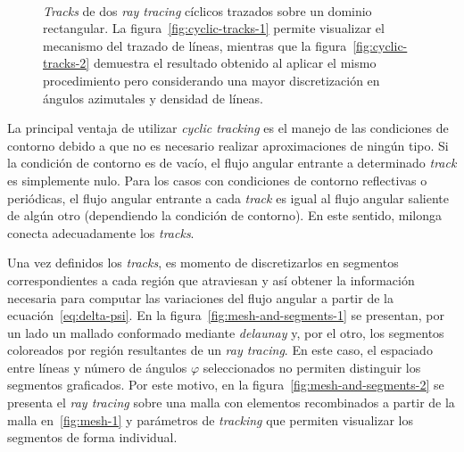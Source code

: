 \documentclass[11pt]{article}
\numberwithin{equation}{section}
\begin{document}
\begin{figure}[!ht]
 \begin{center}
  \\
  \caption{\emph{Tracks} de dos \emph{ray tracing} cíclicos trazados sobre un dominio rectangular. La figura~\ref{fig:cyclic-tracks-1} permite visualizar el mecanismo del trazado de líneas, mientras que la figura~\ref{fig:cyclic-tracks-2} demuestra el resultado obtenido al aplicar el mismo procedimiento pero considerando una mayor discretización en ángulos azimutales y densidad de líneas.}
  \label{fig:cyclic-tracks}
 \end{center}
\end{figure}

La principal ventaja de utilizar \emph{cyclic tracking} es el manejo de las condiciones de contorno debido a que no es necesario realizar aproximaciones de ningún tipo. Si la condición de contorno es de vacío, el flujo angular entrante a determinado \emph{track} es simplemente nulo. Para los casos con condiciones de contorno reflectivas o periódicas, el flujo angular entrante a cada \emph{track} es igual al flujo angular saliente de algún otro (dependiendo la condición de contorno). En este sentido, milonga conecta adecuadamente los \emph{tracks}.

Una vez definidos los \emph{tracks}, es momento de discretizarlos en segmentos correspondientes a cada región que atraviesan y así obtener la información necesaria para computar las variaciones del flujo angular a partir de la ecuación~\eqref{eq:delta-psi}. En la figura~\ref{fig:mesh-and-segments-1} se presentan, por un lado un mallado conformado mediante \emph{delaunay} y, por el otro, los segmentos coloreados por región resultantes de un \emph{ray tracing}. En este caso, el espaciado entre líneas y número de ángulos $\varphi$ seleccionados no permiten distinguir los segmentos graficados. Por este motivo, en la figura~\ref{fig:mesh-and-segments-2} se presenta el \emph{ray tracing} sobre una malla con elementos recombinados a partir de la malla en~\ref{fig:mesh-1} y parámetros de \emph{tracking} que permiten visualizar los segmentos de forma individual.
\end{document}
